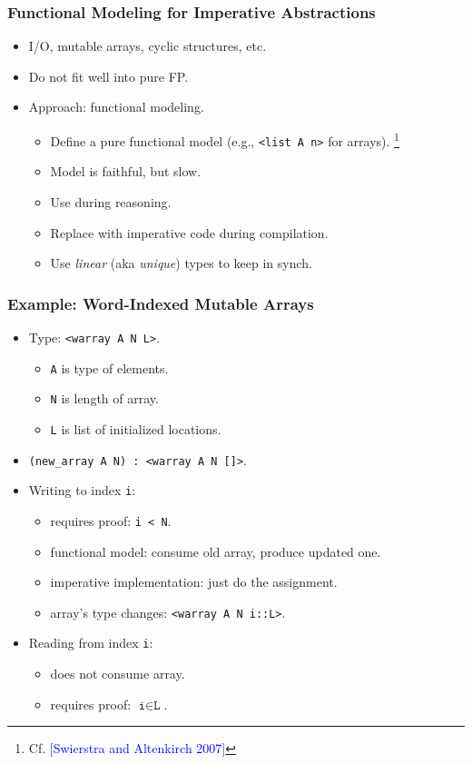 \documentclass[10pt]{beamer}
\begin{document}
\begin{frame}
\frametitle{Functional Modeling for Imperative Abstractions}

\begin{itemize}
\item I/O, mutable arrays, cyclic structures, etc.
\item Do not fit well into pure FP.
\item Approach: functional modeling.
\begin{itemize}
\item Define a pure functional model (e.g., \texttt{<list A n>} for arrays).
 \footnote{Cf. \textcolor{blue}{[Swierstra and Altenkirch 2007]}}
\item Model is faithful, but slow.
\item Use during reasoning.
\item Replace with imperative code during compilation.
\item Use \emph{linear} (aka \emph{unique}) types to keep in synch.
\end{itemize}
\end{itemize}
\end{frame}

\begin{frame}
\frametitle{Example: Word-Indexed Mutable Arrays}

\begin{itemize}
\item Type: \texttt{<warray A N L>}.
\begin{itemize}
\item \texttt{A} is type of elements.
\item \texttt{N} is length of array.
\item \texttt{L} is list of initialized locations.
\end{itemize}

\item \texttt{(new\_array A N) : <warray A N []>}.

\item Writing to index \texttt{i}: 
\begin{itemize}
\item requires proof: \texttt{i < N}.
\item functional model: consume old array, produce updated one.
\item imperative implementation: just do the assignment.
\item array's type changes:  \texttt{<warray A N i::L>}.
\end{itemize}

\item Reading from index \texttt{i}:
\begin{itemize}
\item does not consume array.
\item requires proof: $\texttt{i}\in\texttt{L}$.
\end{itemize}
\end{itemize}
\end{frame}
\end{document}
